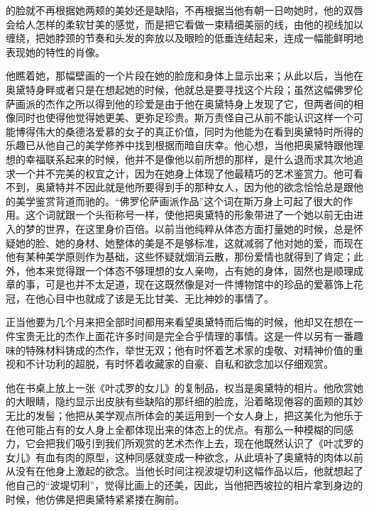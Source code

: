 的脸就不再根据她两颊的美妙还是缺陷，不再根据当他有朝一日吻她时，他的双唇会给人怎样的柔软甘美的感觉，而是把它看做一束精细美丽的线，由他的视线加以缠绕，把她脖颈的节奏和头发的奔放以及眼睑的低垂连结起来，连成一幅能鲜明地表现她的特性的肖像。
\par 他瞧着她，那幅壁画的一个片段在她的脸庞和身体上显示出来；从此以后，当他在奥黛特身畔或者只是在想起她的时候，他就总是要寻找这个片段；虽然这幅佛罗伦萨画派的杰作之所以得到他的珍爱是由于他在奥黛特身上发现了它，但两者间的相像同时也使得他觉得她更美、更弥足珍贵。斯万责怪自己从前不能认识这样一个可能博得伟大的桑德洛爱慕的女子的真正价值，同时为他能为在看到奥黛特时所得的乐趣已从他自己的美学修养中找到根据而暗自庆幸。他心想，当他把奥黛特跟他理想的幸福联系起来的时候，他并不是像他以前所想的那样，是什么退而求其次地追求一个并不完美的权宜之计，因为在她身上体现了他最精巧的艺术鉴赏力。他可看不到，奥黛特并不因此就是他所要得到手的那种女人，因为他的欲念恰恰总是跟他的美学鉴赏背道而驰的。“佛罗伦萨画派作品”这个词在斯万身上可起了很大的作用。这个词就跟一个头衔称号一样，使他把奥黛特的形象带进了一个她以前无由进入的梦的世界，在这里身价百倍。以前当他纯粹从体态方面打量她的时候，总是怀疑她的脸、她的身材、她整体的美是不是够标准，这就减弱了他对她的爱，而现在他有某种美学原则作为基础，这些怀疑就烟消云散，那份爱情也就得到了肯定；此外，他本来觉得跟一个体态不够理想的女人亲吻，占有她的身体，固然也是顺理成章的事，可是也并不太足道，现在这既然像是对一件博物馆中的珍品的爱慕饰上花冠，在他心目中也就成了该是无比甘美、无比神妙的事情了。
\par 正当他要为几个月来把全部时间都用来看望奥黛特而后悔的时候，他却又在想在一件宝贵无比的杰作上面花许多时间是完全合乎情理的事情。这是一件以另有一番趣味的特殊材料铸成的杰作，举世无双；他有时怀着艺术家的虔敬、对精神价值的重视和不计功利的超脱，有时怀着收藏家的自豪、自私和欲念加以仔细观赏。
\par 他在书桌上放上一张《叶忒罗的女儿》的复制品，权当是奥黛特的相片。他欣赏她的大眼睛，隐约显示出皮肤有些缺陷的那纤细的脸庞，沿着略现倦容的面颊的其妙无比的发髻；他把从美学观点所体会的美运用到一个女人身上，把这美化为他乐于在他可能占有的女人身上全都体现出来的体态上的优点。有那么一种模糊的同感力，它会把我们吸引到我们所观赏的艺术杰作上去，现在他既然认识了《叶忒罗的女儿》有血有肉的原型，这种同感就变成一种欲念，从此填补了奥黛特的肉体以前从没有在他身上激起的欲念。当他长时间注视波堤切利这幅作品以后，他就想起了他自己的“波堤切利”，觉得比画上的还美，因此，当他把西坡拉的相片拿到身边的时候，他仿佛是把奥黛特紧紧搂在胸前。
